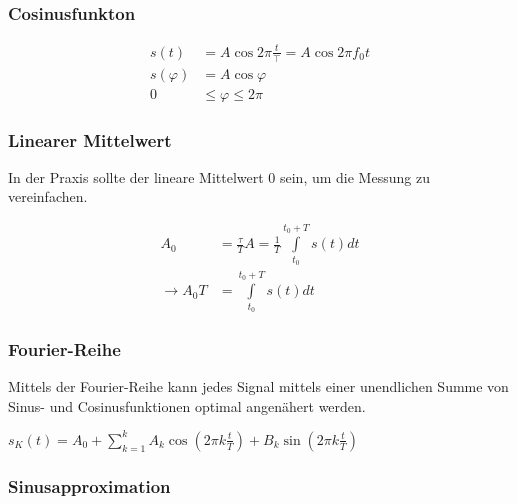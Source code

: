 \begin{multicols}{2}
\subsubsection{Cosinusfunkton}

	\begin{align*}
		s(t) &= A \cos{2 \pi \frac{t}{\top}} = A \cos{2 \pi f_0 t} \\
		s(\varphi) &= A \cos{\varphi} \\
		0 &\leq \varphi \le 2 \pi
	\end{align*}
	
	\noindent{}

	

\subsubsection{Linearer Mittelwert}

	In der Praxis sollte der lineare Mittelwert 0 sein, um die Messung zu vereinfachen.

	\begin{align*}
		A_0 &= \frac{\tau}{T} A = \frac{1}{T} \int\limits_{t_0}^{t_0 + T}{s(t) dt} \\
		\to A_0 T &=  \int\limits_{t_0}^{t_0 + T}{s(t) dt}
	\end{align*}

\subsubsection{Fourier-Reihe}

	Mittels der Fourier-Reihe kann jedes Signal mittels einer unendlichen Summe von Sinus- und Cosinusfunktionen optimal angenähert werden.

	$s_K(t) = A_0 + \sum^k_{k=1}{A_k \cos{(2 \pi k \frac{t}{T})} + B_k \sin{(2 \pi k \frac{t}{T})}}$


\subsubsection{Sinusapproximation}


\end{multicols}


